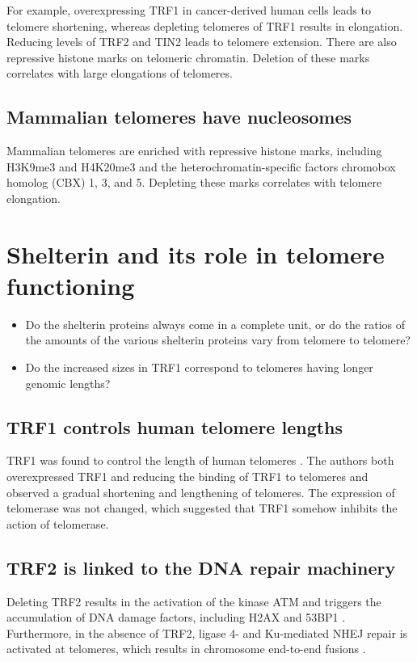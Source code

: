 \documentclass[11pt]{article}
\begin{document}
For example, overexpressing TRF1 in cancer-derived human cells leads
to telomere shortening, whereas depleting telomeres of TRF1 results in
elongation. Reducing levels of TRF2 and TIN2 leads to telomere
extension. There are also repressive histone marks on telomeric
chromatin. Deletion of these marks correlates with large elongations
of telomeres.

\subsection{Mammalian telomeres have nucleosomes}
\label{sec-1-3}
Mammalian telomeres are enriched with repressive histone marks,
including H3K9me3 and H4K20me3 and the heterochromatin-specific
factors chromobox homolog (CBX) 1, 3, and 5. Depleting these marks
correlates with telomere elongation.

\section{Shelterin and its role in telomere functioning}
\label{sec-2}
\begin{itemize}
\item Do the shelterin proteins always come in a complete unit, or do the
ratios of the amounts of the various shelterin proteins vary from
telomere to telomere?
\item Do the increased sizes in TRF1 correspond to telomeres having longer
genomic lengths?
\end{itemize}

\subsection{TRF1 controls human telomere lengths}
\label{sec-2-1}
TRF1 was found to control the length of human telomeres
\cite{vansteensel-nature-1997}. The authors both overexpressed TRF1
and reducing the binding of TRF1 to telomeres and observed a gradual
shortening and lengthening of telomeres. The expression of telomerase
was not changed, which suggested that TRF1 somehow inhibits the action
of telomerase.

\subsection{TRF2 is linked to the DNA repair machinery}
\label{sec-2-2}
Deleting TRF2 results in the activation of the kinase ATM and triggers
the accumulation of DNA damage factors, including H2AX and 53BP1
\cite{sfeir-jcellsci-2012}. Furthermore, in the absence of TRF2,
ligase 4- and Ku-mediated NHEJ repair is activated at telomeres, which
results in chromosome end-to-end fusions \cite{sfeir-jcellsci-2012}.
\end{document}
